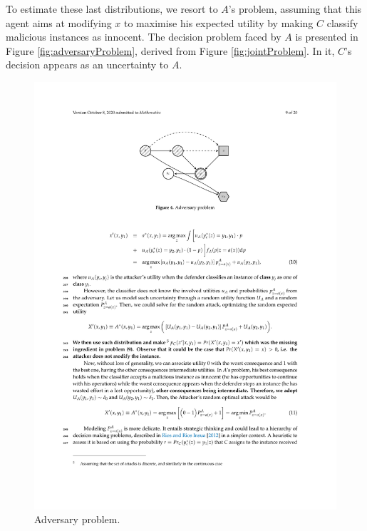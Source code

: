 To estimate these last distributions, we resort to $A$'s problem, assuming that this agent aims at modifying $x$ to maximise his expected utility by making $C$ classify malicious instances as innocent. The decision problem faced by $A$ is presented in Figure \ref{fig:adversaryProblem}, derived from Figure \ref{fig:jointProblem}. In it, $C$'s decision appears as an uncertainty to $A$. 
\begin{figure}[H]
\centering
\includegraphics[scale=1]{figures/4.pdf}
\caption{Adversary problem.}\label{fig:adversaryProblem}\label{id}
\end{figure}
